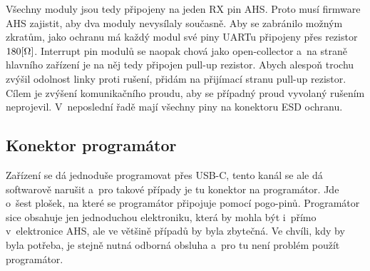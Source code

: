 Všechny moduly jsou tedy připojeny na jeden RX pin AHS.
Proto musí firmware AHS zajistit, aby dva moduly nevysílaly současně.
Aby se zabránilo možným zkratům, jako ochranu má každý modul své piny UARTu připojeny přes rezistor \(180\-[\Omega]\).
Interrupt pin modulů se naopak chová jako open-collector a~na straně hlavního zařízení je na něj tedy připojen pull-up rezistor.
Abych alespoň trochu zvýšil odolnost linky proti rušení, přidám na přijímací stranu pull-up rezistor.
Cílem je zvýšení komunikačního proudu, aby se případný proud vyvolaný rušením neprojevil.
V~neposlední řadě mají všechny piny na konektoru ESD ochranu.

\newpage
\subsection{Konektor programátor}
Zařízení se dá jednoduše programovat přes USB-C, tento kanál se ale dá softwarově narušit a~pro takové případy je tu konektor na programátor.
Jde o~šest plošek, na které se programátor připojuje pomocí pogo-pinů.
Programátor sice obsahuje jen jednoduchou elektroniku, která by mohla být i~přímo v~elektronice AHS, ale ve většině případů by byla zbytečná.
Ve chvíli, kdy by byla potřeba, je stejně nutná odborná obsluha a~pro tu není problém použít programátor.

